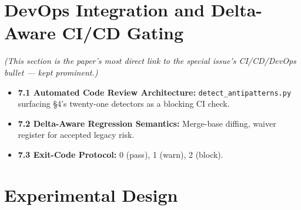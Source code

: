 \documentclass[11pt]{article}
\begin{document}
\section{DevOps Integration and Delta-Aware CI/CD Gating}

\emph{(This section is the paper's most direct link to the special issue's CI/CD/DevOps bullet ---
kept prominent.)}

\begin{itemize}[leftmargin=*]
\item \textbf{7.1 Automated Code Review Architecture:} \texttt{detect\_antipatterns.py} surfacing
  \S4's twenty-one detectors as a blocking CI check.
\item \textbf{7.2 Delta-Aware Regression Semantics:} Merge-base diffing, waiver register for
  accepted legacy risk.
\item \textbf{7.3 Exit-Code Protocol:} 0 (pass), 1 (warn), 2 (block).
\end{itemize}

\section{Experimental Design}
\end{document}
